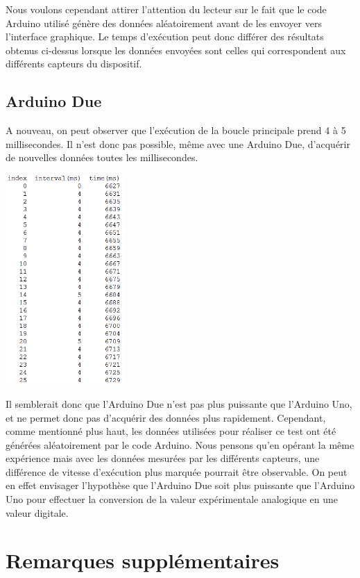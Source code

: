 Nous voulons cependant attirer l'attention du lecteur sur le fait que le code Arduino utilisé génère des données aléatoirement avant de les envoyer vers l'interface graphique. Le temps d'exécution peut donc différer des résultats obtenus ci-dessus lorsque les données envoyées sont celles qui correspondent aux différents capteurs du dispositif.

\subsection{Arduino Due}
A nouveau, on peut observer que l'exécution de la boucle principale prend 4 à 5 millisecondes. Il n'est donc pas possible, même avec une Arduino Due, d'acquérir de nouvelles données toutes les millisecondes.

\begin{center}
    \includegraphics[height=8cm]{images/arduino_due.png}
\end{center}

Il semblerait donc que l'Arduino Due n'est pas plus puissante que l'Arduino Uno, et ne permet donc pas d'acquérir des données plus rapidement. Cependant, comme mentionné plus haut, les données utilisées pour réaliser ce test ont été générées aléatoirement par le code Arduino. Nous pensons qu'en opérant la même expérience mais avec les données mesurées par les différents capteurs, une différence de vitesse d'exécution plus marquée pourrait être observable. On peut en effet envisager l'hypothèse que l'Arduino Due soit plus puissante que l'Arduino Uno pour effectuer la conversion de la valeur expérimentale analogique en une valeur digitale.

\newpage
\section{Remarques supplémentaires}

